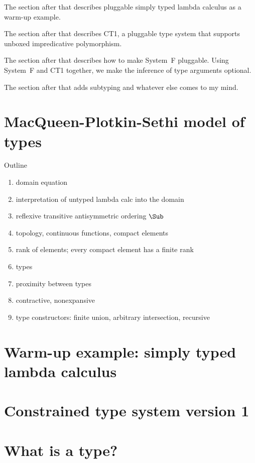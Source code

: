 \documentclass{amsart}
\begin{document}
The section after that describes pluggable simply typed lambda
calculus as a warm-up example.

The section after that describes CT1, a pluggable type system
that supports unboxed impredicative polymorphism.

The section after that describes how to make System~F pluggable.
Using System~F and CT1 together, we make the inference of type
arguments optional.

The section after that adds subtyping and whatever else comes to
my mind.


\section{MacQueen-Plotkin-Sethi model of types}

Outline
\begin{enumerate}
\item domain equation
\item interpretation of untyped lambda calc into the domain
\item reflexive transitive antisymmetric ordering $\Sub$
\item topology, continuous functions, compact elements
\item rank of elements; every compact element has a finite rank
\item types
\item proximity between types
\item contractive, nonexpansive
\item type constructors: finite union, arbitrary intersection, recursive
\end{enumerate}



\section{Warm-up example: simply typed lambda calculus}




\section{Constrained type system version 1}


\appendix

\section{What is a type?}
\end{document}
